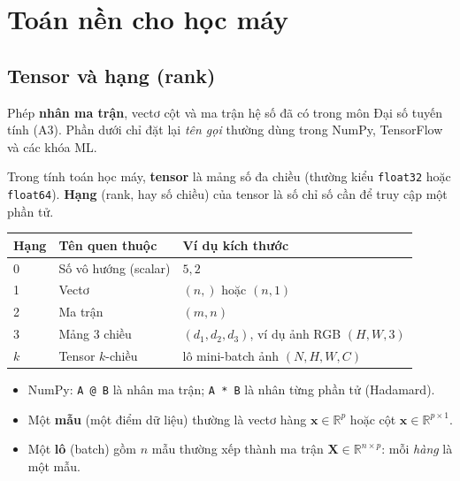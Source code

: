 \documentclass[12pt,a4paper]{article}
\begin{document}
\section{Toán nền cho học máy}

\subsection{Tensor và hạng (rank)}

\begin{luuy}[title={Liên hệ đại số tuyến tính}]
  Phép \textbf{nhân ma trận}, vectơ cột và ma trận hệ số đã có trong môn Đại số tuyến tính (A3).
  Phần dưới chỉ đặt lại \emph{tên gọi} thường dùng trong NumPy, TensorFlow và các khóa ML.
\end{luuy}

\begin{dinhnghia}[title={Tensor}]
  Trong tính toán học máy, \textbf{tensor} là mảng số đa chiều (thường kiểu \texttt{float32} hoặc \texttt{float64}).
  \textbf{Hạng} (rank, hay số chiều) của tensor là số chỉ số cần để truy cập một phần tử.
\end{dinhnghia}

\begin{congthuc}[title={Hạng tensor và ví dụ}]
  \begin{center}
  \renewcommand{\arraystretch}{1.25}
  \begin{tabular}{lll}
    \hline
    Hạng & Tên quen thuộc & Ví dụ kích thước \\
    \hline
    0 & Số vô hướng (scalar) & $5{,}2$ \\
    1 & Vectơ & $(n,)$ hoặc $(n,1)$ \\
    2 & Ma trận & $(m,n)$ \\
    3 & Mảng 3 chiều & $(d_1,d_2,d_3)$, ví dụ ảnh RGB $(H,W,3)$ \\
    $k$ & Tensor $k$-chiều & lô mini-batch ảnh $(N,H,W,C)$ \\
    \hline
  \end{tabular}
  \end{center}
\end{congthuc}

\begin{tinhchat}[title={Quy ước trong code}]
  \begin{itemize}
    \item NumPy: \verb|A @ B| là nhân ma trận; \verb|A * B| là nhân từng phần tử (Hadamard).
    \item Một \textbf{mẫu} (một điểm dữ liệu) thường là vectơ hàng $\mathbf{x} \in \mathbb{R}^p$ hoặc cột $\mathbf{x} \in \mathbb{R}^{p \times 1}$.
    \item Một \textbf{lô} (batch) gồm $n$ mẫu thường xếp thành ma trận $\mathbf{X} \in \mathbb{R}^{n \times p}$: mỗi \emph{hàng} là một mẫu.
  \end{itemize}
\end{tinhchat}
\end{document}
